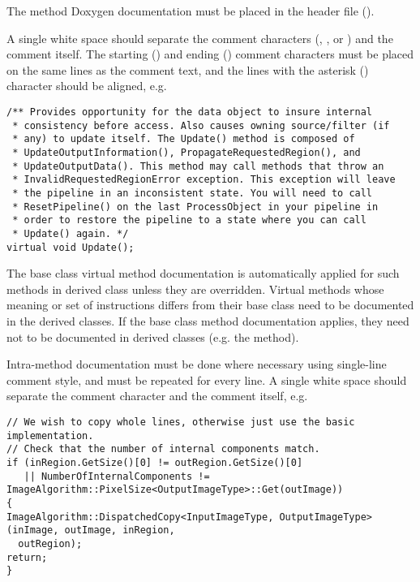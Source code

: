 The method Doxygen documentation must be placed in the header file ().

A single white space should separate the comment characters (\code{/**},
\code{*}, or \code{*/}) and the comment itself. The starting (\code{/**})
and ending (\code{*/}) comment characters must be placed on the same lines
as the comment text, and the lines with the asterisk (\code{*}) character
should be aligned, e.g.

\small
\begin{verbatim}
/** Provides opportunity for the data object to insure internal
 * consistency before access. Also causes owning source/filter (if
 * any) to update itself. The Update() method is composed of
 * UpdateOutputInformation(), PropagateRequestedRegion(), and
 * UpdateOutputData(). This method may call methods that throw an
 * InvalidRequestedRegionError exception. This exception will leave
 * the pipeline in an inconsistent state. You will need to call
 * ResetPipeline() on the last ProcessObject in your pipeline in
 * order to restore the pipeline to a state where you can call
 * Update() again. */
virtual void Update();
\end{verbatim}
\normalsize

The base class virtual method documentation is automatically applied for such
methods in derived class unless they are overridden. Virtual methods whose
meaning or set of instructions differs from their base class need to be
documented in the derived classes. If the base class method documentation
applies, they need not to be documented in derived classes (e.g. the
 method).

Intra-method documentation must be done where necessary using single-line comment
style, and must be repeated for every line. A single white space should separate
the comment character \code{//} and the comment itself, e.g.

\small
\begin{verbatim}
// We wish to copy whole lines, otherwise just use the basic implementation.
// Check that the number of internal components match.
if (inRegion.GetSize()[0] != outRegion.GetSize()[0]
   || NumberOfInternalComponents != ImageAlgorithm::PixelSize<OutputImageType>::Get(outImage))
{
ImageAlgorithm::DispatchedCopy<InputImageType, OutputImageType>(inImage, outImage, inRegion,
  outRegion);
return;
}
\end{verbatim}
\normalsize

